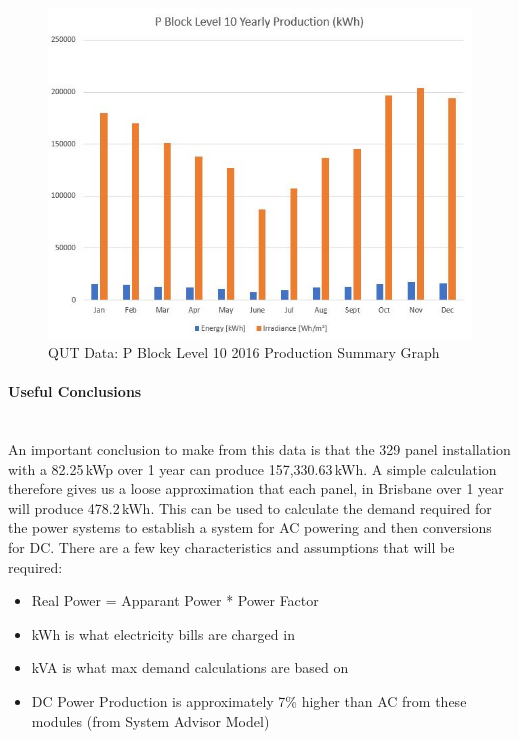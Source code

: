 \begin{figure}[H]
	\hfill\includegraphics[width = 150mm]{images/metering/meteo/p-block-lvl10-yearly-production}\hspace*{\fill}
	\caption{QUT Data: P Block Level 10 2016 Production Summary Graph} 
	\label{fig:qut-pv-lvl10-2016}
\end{figure}  

\paragraph{Useful Conclusions}
~\\
An important conclusion to make from this data is that the 329 panel installation with a 82.25\,kWp over 1 year can produce 157,330.63\,kWh. A simple calculation therefore gives us a loose approximation that each panel, in Brisbane over 1 year will produce 478.2\,kWh. This can be used to calculate the demand required for the power systems to establish a system for AC powering and then conversions for DC. There are a few key characteristics and assumptions that will be required:

\begin{itemize}[noitemsep,nolistsep]
	\item Real Power = Apparant Power * Power Factor
	\item kWh is what electricity bills are charged in
	\item kVA is what max demand calculations are based on
	\item DC Power Production is approximately 7\% higher than AC from these modules (from System Advisor Model)
\end{itemize} 

